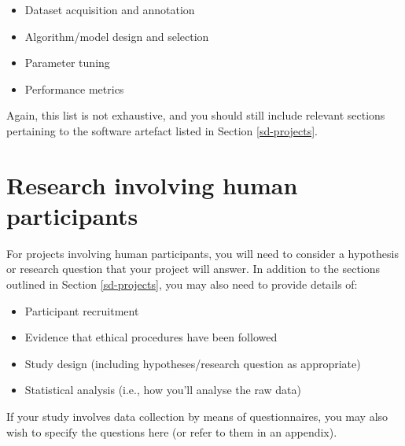 \begin{itemize}
    \item Dataset acquisition and annotation
    \item Algorithm/model design and selection
    \item Parameter tuning
    \item Performance metrics
\end{itemize}

Again, this list is not exhaustive, and you should still include relevant sections pertaining to the software artefact listed in Section \ref{sd-projects}.

\section{Research involving human participants}

For projects involving human participants, you will need to consider a hypothesis or research question that your project will answer. In addition to the sections outlined in Section \ref{sd-projects}, you may also need to provide details of:

\begin{itemize}
    \item Participant recruitment
    \item Evidence that ethical procedures have been followed
    \item Study design (including hypotheses/research question as appropriate)
    \item Statistical analysis (i.e., how you'll analyse the raw data)
\end{itemize}

If your study involves data collection by means of questionnaires, you may also wish to specify the questions here (or refer to them in an appendix).